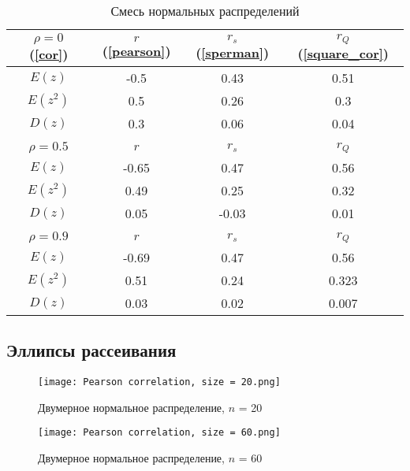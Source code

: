 \documentclass[a4paper]{article}
\begin{document}
        \begin{table}[H]
            \centering
            \begin{tabular}{|c|c|c|c|}
                \hline
                 $\rho = 0$ (\ref{cor}) & $r$ (\ref{pearson}) & $r_s$ (\ref{sperman}) & $r_Q$ (\ref{square_cor})  \\ \hline
                 $E(z)$ & -0.5 & 0.43 & 0.51  \\ \hline
                 $E(z^2)$ & 0.5 & 0.26 & 0.3  \\ \hline
                 $D(z)$ & 0.3 & 0.06 & 0.04  \\ \hline
                 & & & \\ \hline
                 $\rho = 0.5$ & $r$ & $r_s$ & $r_Q$  \\ \hline
                 $E(z)$ & -0.65 & 0.47 & 0.56 \\ \hline
                 $E(z^2)$ & 0.49 & 0.25 & 0.32  \\ \hline
                 $D(z)$ & 0.05 & -0.03 & 0.01  \\ \hline
                 & & & \\ \hline
                 $\rho = 0.9$ & $r$ & $r_s$ & $r_Q$  \\ \hline
                 $E(z)$ & -0.69 & 0.47 & 0.56  \\ \hline
                 $E(z^2)$ & 0.51 & 0.24 & 0.323  \\ \hline
                 $D(z)$ & 0.03 & 0.02 & 0.007  \\ \hline
                 
            \end{tabular}
            \caption{Смесь нормальных распределений}
            \label{tab:mixed}
        \end{table}

    \subsection{Эллипсы рассеивания}
    
        \begin{figure}[H]
            \centering
            \texttt{[image: Pearson correlation, size = 20.png]}
            \caption{Двумерное нормальное распределение, $n$ = 20}
            \label{fig:pearson_20}
        \end{figure}
        
        \begin{figure}[H]
            \centering
            \texttt{[image: Pearson correlation, size = 60.png]}
            \caption{Двумерное нормальное распределение, $n$ = 60}
            \label{fig:pearson_60}
        \end{figure}
        
\end{document}
